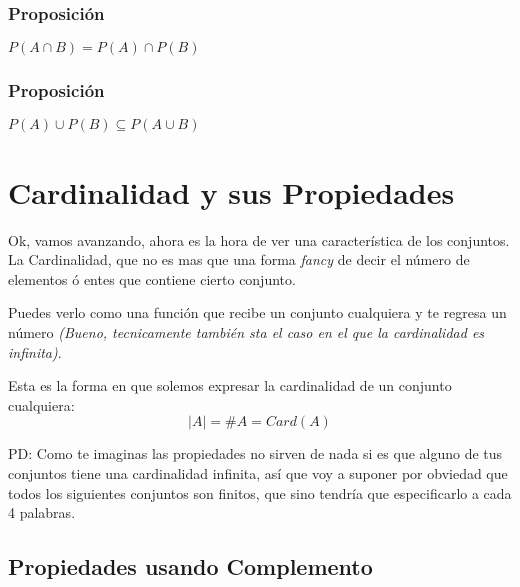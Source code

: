 \documentclass[12pt]{report}                                    %
\begin{document}
            \subsubsection{Proposición}
                $P(A \cap B) = P(A) \cap P(B)$

            \subsubsection{Proposición}
                $P(A) \cup P(B) \subseteq P(A \cup B)$






    \clearpage
    \section{Cardinalidad y sus Propiedades}
            
        Ok, vamos avanzando, ahora es la hora de ver una característica de los conjuntos.
        La Cardinalidad, que no es mas que una forma \emph{fancy} de decir el número de 
        elementos ó entes que contiene cierto conjunto.

        Puedes verlo como una función que recibe un conjunto cualquiera y te regresa
        un número \emph{(Bueno, tecnicamente también sta el caso en el que la cardinalidad es infinita)}.

        Esta es la forma en que solemos expresar la cardinalidad de un conjunto cualquiera:
        \begin{equation}   
            |A| = \#A = Card(A)
        \end{equation}

        PD: Como te imaginas las propiedades no sirven de nada si es que alguno de tus conjuntos
        tiene una cardinalidad infinita, así que voy a suponer por obviedad que todos los siguientes
        conjuntos son finitos, que sino tendría que especificarlo a cada 4 palabras.



        \clearpage
        \subsection{Propiedades usando Complemento}
            
\end{document}
